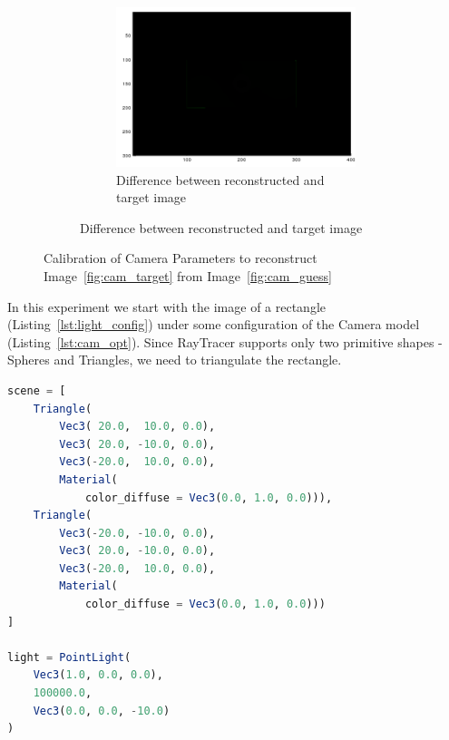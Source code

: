 \documentclass{juliacon}
\begin{document}
\begin{figure}[!htb]
\begin{subfigure}[c]{0.45\textwidth}
\begin{subfigure}[c]{0.45\textwidth}
            \includegraphics[width=\textwidth]{images/camera/diff.png}
            \caption{Difference between reconstructed and target image}
        \end{subfigure}
    \end{subfigure}
    \caption{Calibration of Camera Parameters to reconstruct Image~\ref{fig:cam_target} from Image~\ref{fig:cam_guess}}
    \label{fig:cam_invrender}
\end{figure}

In this experiment we start with the image of a rectangle (Listing~\ref{lst:light_config}) under some configuration of the Camera model (Listing~\ref{lst:cam_opt}). Since RayTracer supports only two primitive shapes - Spheres and Triangles, we need to triangulate the rectangle.

\begin{lstlisting}[caption = {Configuration of the Scene for Experiment~\ref{sec:calcam}},
                   label = {lst:light_config},
                   captionpos = b,
                   language = Julia]
scene = [
    Triangle(
        Vec3( 20.0,  10.0, 0.0),
        Vec3( 20.0, -10.0, 0.0),
        Vec3(-20.0,  10.0, 0.0),
        Material(
            color_diffuse = Vec3(0.0, 1.0, 0.0))),
    Triangle(
        Vec3(-20.0, -10.0, 0.0),
        Vec3( 20.0, -10.0, 0.0),
        Vec3(-20.0,  10.0, 0.0),
        Material(
            color_diffuse = Vec3(0.0, 1.0, 0.0)))
]

light = PointLight(
    Vec3(1.0, 0.0, 0.0),
    100000.0,
    Vec3(0.0, 0.0, -10.0)
)
\end{lstlisting}
\end{document}
